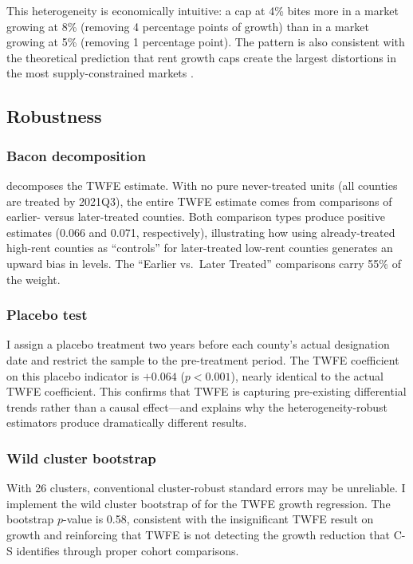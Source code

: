 \documentclass[12pt]{article}
\begin{document}



This heterogeneity is economically intuitive: a cap at 4\% bites more in a market growing at 8\% (removing 4 percentage points of growth) than in a market growing at 5\% (removing 1 percentage point). The pattern is also consistent with the theoretical prediction that rent growth caps create the largest distortions in the most supply-constrained markets \citep{arnott1995}.

\subsection{Robustness}

\subsubsection*{Bacon decomposition}  decomposes the TWFE estimate. With no pure never-treated units (all counties are treated by 2021Q3), the entire TWFE estimate comes from comparisons of earlier- versus later-treated counties. Both comparison types produce positive estimates (0.066 and 0.071, respectively), illustrating how using already-treated high-rent counties as ``controls'' for later-treated low-rent counties generates an upward bias in levels. The ``Earlier vs.\ Later Treated'' comparisons carry 55\% of the weight.




\subsubsection*{Placebo test} I assign a placebo treatment two years before each county's actual designation date and restrict the sample to the pre-treatment period. The TWFE coefficient on this placebo indicator is $+0.064$ ($p < 0.001$), nearly identical to the actual TWFE coefficient. This confirms that TWFE is capturing pre-existing differential trends rather than a causal effect---and explains why the heterogeneity-robust estimators produce dramatically different results.

\subsubsection*{Wild cluster bootstrap} With 26 clusters, conventional cluster-robust standard errors may be unreliable. I implement the wild cluster bootstrap of \citet{cameron2008} for the TWFE growth regression. The bootstrap $p$-value is 0.58, consistent with the insignificant TWFE result on growth and reinforcing that TWFE is not detecting the growth reduction that C-S identifies through proper cohort comparisons.
\end{document}
